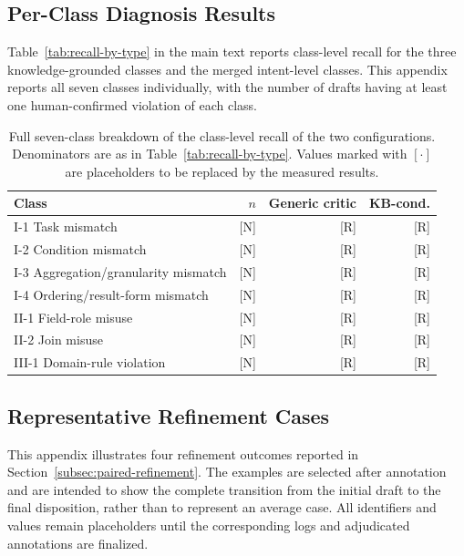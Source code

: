 \documentclass[letterpaper,journal]{IEEEtran}
\begin{document}
\subsection{Per-Class Diagnosis Results}
\label{app:diagnosis-by-type}

Table~\ref{tab:recall-by-type} in the main text reports class-level recall for the three knowledge-grounded classes and the merged intent-level classes. This appendix reports all seven classes individually, with the number of drafts having at least one human-confirmed violation of each class.

\begin{table}[!t]
\centering
\caption{Full seven-class breakdown of the class-level recall of the two configurations. Denominators are as in Table~\ref{tab:recall-by-type}. Values marked with $[\cdot]$ are placeholders to be replaced by the measured results.}
\label{tab:recall-by-type-full}
\small
\setlength{\tabcolsep}{4pt}
\begin{tabular}{lrrr}
\toprule
\textbf{Class} & \textbf{$n$} & \textbf{Generic critic} & \textbf{KB-cond.} \\
\midrule
I-1 Task mismatch & [N] & [R] & [R] \\
I-2 Condition mismatch & [N] & [R] & [R] \\
I-3 Aggregation/granularity mismatch & [N] & [R] & [R] \\
I-4 Ordering/result-form mismatch & [N] & [R] & [R] \\
II-1 Field-role misuse & [N] & [R] & [R] \\
II-2 Join misuse & [N] & [R] & [R] \\
III-1 Domain-rule violation & [N] & [R] & [R] \\
\bottomrule
\end{tabular}
\end{table}

\subsection{Representative Refinement Cases}
\label{app:refinement-cases}

This appendix illustrates four refinement outcomes reported in Section~\ref{subsec:paired-refinement}. The examples are selected after annotation and are intended to show the complete transition from the initial draft to the final disposition, rather than to represent an average case. All identifiers and values remain placeholders until the corresponding logs and adjudicated annotations are finalized.
\end{document}
